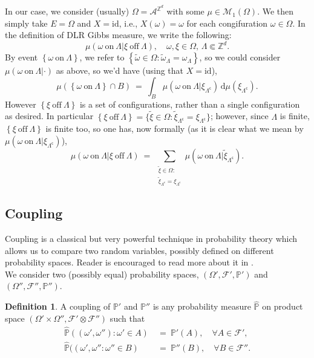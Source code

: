 \documentclass[12pt]{article}
\newcommand{\A}{\mathcal{A}}
\renewcommand{\d}{\mathrm{d}}
\newcommand{\F}{\mathcal{F}}
\newcommand{\M}{\mathcal{M}}
\renewcommand{\P}{\mathbb{P}}
\newcommand{\Z}{\mathbb{Z}}
\newcommand{\set}[1]{\left\{#1\right\}}
\newcommand{\pika}{\boldsymbol{\cdot}}
\newcommand{\1}{\mathbbm{1}}
\renewcommand{\c}{\mathsf{c}}
\newcommand{\5}{\vspace{0.5cm}}
\renewcommand{\tilde}{\widetilde}
\renewcommand{\hat}{\widehat}
\theoremstyle{definition}
\newtheorem{df}[thm]{Definition}
\begin{document}
In our case, we consider (usually) $\Omega=\A^{\Z^d}$ with some $\mu\in\M_1(\Omega)$. We then simply take $E=\Omega$ and $X=\mathrm{id}$, i.e., $X(\omega)=\omega$ for each congifuration $\omega\in\Omega$. In the definition of DLR Gibbs measure, we write the following:
$$\mu(\omega~\text{on}~\Lambda|\xi~\text{off}~\Lambda),\quad \omega,\xi\in\Omega,\,\Lambda\Subset\Z^d.$$
By event $\set{\omega~\text{on}~\Lambda}$, we refer to $\set{\tilde{\omega}\in\Omega:\tilde{\omega}_\Lambda=\omega_\Lambda}$, so we could consider $\mu(\omega~\text{on}~\Lambda|\pika)$ as above, so we'd have (using that $X=\mathrm{id}$),
$$\mu(\set{\omega~\text{on}~\Lambda}\cap B) ~=~ \int_B \mu(\omega~\text{on}~\Lambda|\xi_{\Lambda^\c})\,\d\mu(\xi_{\Lambda^\c}).$$
However $\set{\xi~\text{off}~\Lambda}$ is a set of configurations, rather than a single configuration as desired. In particular $\set{\xi~\text{off}~\Lambda}=\{\tilde{\xi}\in\Omega:\tilde{\xi}_{\Lambda^\c}=\xi_{\Lambda^\c}\}$; however, since $\Lambda$ is finite, $\set{\xi~\text{off}~\Lambda}$ is finite too, so one has, now formally (as it is clear what we mean by $\mu(\omega~\text{on}~\Lambda|\xi_{\Lambda^\c})$),
$$\mu(\omega~\text{on}~\Lambda|\xi~\text{off}~\Lambda) ~=~ \sum_{\substack{\tilde{\xi}\in\Omega:\\\tilde{\xi}_{\Lambda^\c}=\xi_{\Lambda^\c}}}\mu(\omega~\text{on}~\Lambda|\tilde{\xi}_{\Lambda^\c}).$$ 


\subsection{Coupling}\label{app:2}

Coupling is a classical but very powerful technique in probability theory which allows us to compare two random variables, possibly defined on different probability spaces. Reader is encouraged to read more about it in \cite{dH}.\\ 

We consider two (possibly equal) probability spaces, $(\Omega',\F',\P')$ and $(\Omega'',\F'',\P'')$.

\begin{df}
A coupling of $\P'$ and $\P''$ is any probability measure $\hat{\P}$ on product space $(\Omega'\times\Omega'',\F'\otimes\F'')$ such that 
\begin{align*}
\hat{\P}((\omega',\omega''):\omega'\in A) ~&=~ \P'(A), \quad \forall A\in\F', \\
\hat{\P}((\omega',\omega'':\omega''\in B) ~&=~ \P''(B), \quad \forall B\in\F''.
\end{align*}
\end{df}
\end{document}
